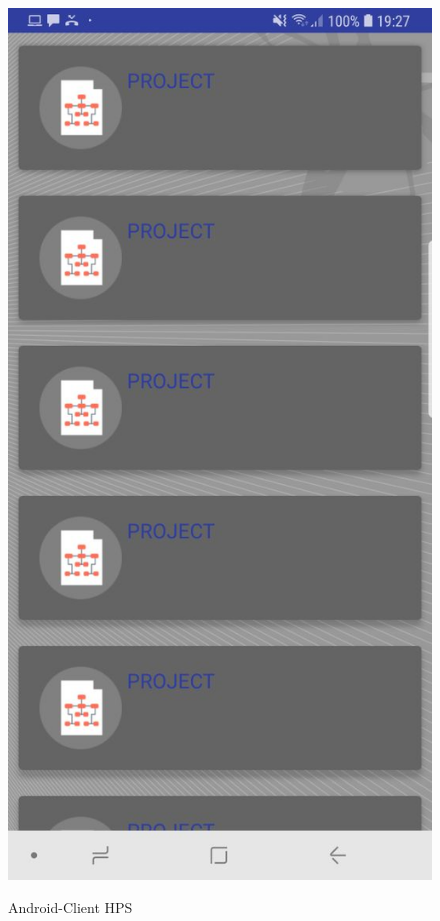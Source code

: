 \begin{figure}[htb]
         \includegraphics[scale=0.2]{img/soft/project.jpeg}\\
  \caption{Android-Client HPS}
  \label{sec:hps}
\end{figure}
